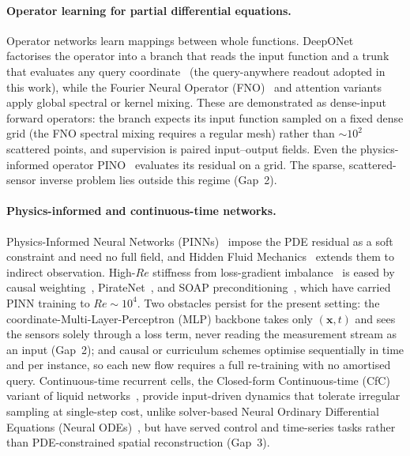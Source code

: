 \paragraph{Operator learning for partial differential equations.}
Operator networks learn mappings between whole functions. DeepONet~\cite{Lu2021NMI} factorises the operator into a branch that reads the input function and a trunk that evaluates any query coordinate~\cite{ChenChen1995} (the query-anywhere readout adopted in this work), while the Fourier Neural Operator (FNO)~\cite{Li2021FNO} and attention variants~\cite{Cao2021Galerkin, Li2023OFormer} apply global spectral or kernel mixing. These are demonstrated as dense-input forward operators: the branch expects its input function sampled on a fixed dense grid (the FNO spectral mixing requires a regular mesh) rather than $\sim 10^2$ scattered points, and supervision is paired input--output fields. Even the physics-informed operator PINO~\cite{Li2021PINO} evaluates its residual on a grid. The sparse, scattered-sensor inverse problem lies outside this regime (Gap~2).

\paragraph{Physics-informed and continuous-time networks.}
Physics-Informed Neural Networks (PINNs)~\cite{Raissi2019JCP} impose the PDE residual as a soft constraint and need no full field, and Hidden Fluid Mechanics~\cite{Raissi2020Science} extends them to indirect observation. High-$Re$ stiffness from loss-gradient imbalance~\cite{Krishnapriyan2021} is eased by causal weighting~\cite{wang2022respectingcausality}, PirateNet~\cite{Wang2024JMLR}, and SOAP preconditioning~\cite{wang2025gradientalignmentpinns}, which have carried PINN training to $Re\sim10^4$. Two obstacles persist for the present setting: the coordinate-Multi-Layer-Perceptron (MLP) backbone takes only $(\mathbf{x},t)$ and sees the sensors solely through a loss term, never reading the measurement stream as an input (Gap~2); and causal or curriculum schemes optimise sequentially in time and per instance, so each new flow requires a full re-training with no amortised query. Continuous-time recurrent cells, the Closed-form Continuous-time (CfC) variant of liquid networks~\cite{Hasani2022CfC}, provide input-driven dynamics that tolerate irregular sampling at single-step cost, unlike solver-based Neural Ordinary Differential Equations (Neural ODEs)~\cite{Chen2018NODE}, but have served control and time-series tasks rather than PDE-constrained spatial reconstruction (Gap~3).

